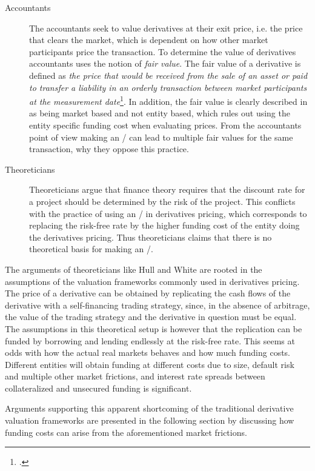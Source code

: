 \documentclass[../../../main.tex]{subfiles}
\begin{document}
\begin{description}
            \item[Accountants] The accountants seek to value derivatives at their exit price, i.e. the price that clears the market,
            which is dependent on how other market participants price the transaction.
            To determine the value of derivatives accountants uses the notion of \textit{fair value}.
            The fair value of a derivative is defined as \textit{the price that would be received from the sale of an asset or paid to transfer a liability in an orderly transaction between market participants at the measurement date}\footcite{IFRS13}.
            In addition, the fair value is clearly described in \cite{IFRS13} as being market based and not entity based,
            which rules out using the entity specific funding cost when evaluating prices.
            From the accountants point of view making an \FVA/ can lead to multiple fair values for the same transaction,
            why they oppose this practice.
            \item[Theoreticians] Theoreticians argue that finance theory requires that the discount rate for a project should be determined by the risk of the project.
            This conflicts with the practice of using an \FVA/ in derivatives pricing,
            which corresponds to replacing the risk-free rate by the higher funding cost of the entity doing the derivatives pricing.
            Thus theoreticians claims that there is no theoretical basis for making an \FVA/.
        \end{description}

        The arguments of theoreticians like Hull and White are rooted in the assumptions of the valuation frameworks commonly used in derivatives pricing.
        The price of a derivative can be obtained by replicating the cash flows of the derivative with a self-financing trading strategy, 
        since, in the absence of arbitrage, the value of the trading strategy and the derivative in question must be equal.
        The assumptions in this theoretical setup is however 
        that the replication can be funded by borrowing and lending endlessly at the risk-free rate.
        This seems at odds with how the actual real markets behaves and how much funding costs.
        Different entities will obtain funding at different costs due to size,
        default risk and multiple other market frictions,
        and interest rate spreads between collateralized and unsecured funding is significant.

        Arguments supporting this apparent shortcoming of the traditional derivative valuation frameworks are presented in the following section by discussing how funding costs can arise from the aforementioned market frictions.
    
\end{document}
